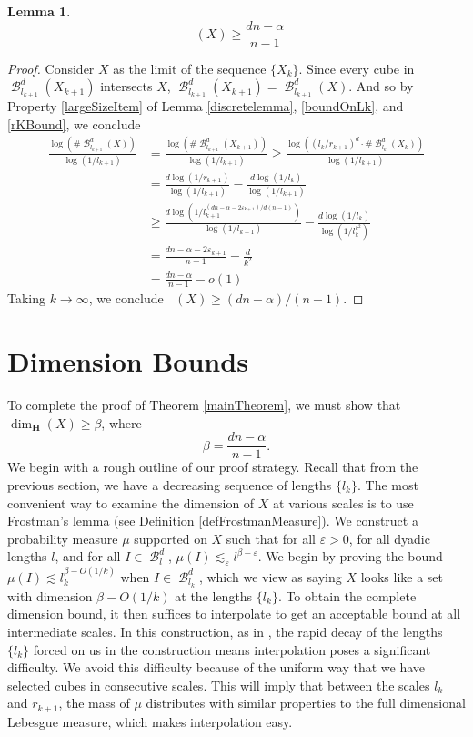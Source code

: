\documentclass[dvipsnames,letterpaper,12pt]{article}
\numberwithin{equation}{section}
\theoremstyle{plain}
\newtheorem{lemma}{Lemma}
\theoremstyle{remark}
\DeclareMathOperator{\upminkdim}{\overline{\dim}_{\mathbf{M}}}
\DeclareMathOperator{\B}{\mathcal{B}}
\begin{document}
\begin{lemma}
	\[ \upminkdim(X) \geq \frac{dn - \alpha}{n - 1} \]
\end{lemma}
\begin{proof}
	Consider $X$ as the limit of the sequence $\{ X_k \}$. Since every cube in $\B^d_{l_{k+1}}(X_{k+1})$ intersects $X$, $\B^d_{l_{k+1}}(X_{k+1}) = \B^d_{l_{k+1}}(X)$. And so by Property \ref{largeSizeItem} of Lemma \ref{discretelemma}, \eqref{boundOnLk}, and \eqref{rKBound}, we conclude
	\begin{align*}
		\frac{\log(\# \B^d_{l_{k+1}}(X))}{\log(1/l_{k+1})} &= \frac{\log(\# \B^d_{l_{k+1}}(X_{k+1}))}{\log(1/l_{k+1})} \geq \frac{\log((l_k/r_{k+1})^d \cdot \# \B^d_{l_k}(X_k))}{\log(1/l_{k+1})}\\
		&= \frac{d \log(1/r_{k+1})}{\log(1/l_{k+1})} - \frac{d \log(1/l_k)}{\log(1/l_{k+1})}\\
		&\geq \frac{d \log \left(1/l_{k+1}^{(dn - \alpha - 2\varepsilon_{k+1})/d(n-1)} \right)}{\log(1/l_{k+1})} - \frac{d \log(1/l_k)}{\log(1/l_k^{k^2})}\\
		&= \frac{dn - \alpha - 2\varepsilon_{k+1}}{n-1} - \frac{d}{k^2}\\
		&= \frac{dn - \alpha}{n-1} - o(1)
	\end{align*}
	Taking $k \to \infty$, we conclude $\upminkdim(X) \geq (dn - \alpha)/(n-1)$.
\end{proof}







\section{Dimension Bounds}\label{dimensionsection}

To complete the proof of Theorem \ref{mainTheorem}, we must show that $\dim_{\mathbf{H}}(X) \geq \beta$, where
%
\[ \beta = \frac{dn - \alpha}{n - 1}. \]
%
We begin with a rough outline of our proof strategy. Recall that from the previous section, we have a decreasing sequence of lengths $\{ l_k \}$. The most convenient way to examine the dimension of $X$ at various scales is to use Frostman's lemma (see Definition \ref{defFrostmanMeasure}). We construct a probability measure $\mu$ supported on $X$ such that for all $\varepsilon > 0$, for all dyadic lengths $l$, and for all $I \in \B^d_l$, $\mu(I) \lesssim_\varepsilon l^{\beta - \varepsilon}$. We begin by proving the bound $\mu(I) \lesssim l_k^{\beta - O(1/k)}$ when $I \in \B^d_{l_k}$, which we view as saying $X$ looks like a set with dimension $\beta - O(1/k)$ at the lengths $\{ l_k \}$. To obtain the complete dimension bound, it then suffices to interpolate to get an acceptable bound at all intermediate scales. In this construction, as in \cite{MalabikaRob}, the rapid decay of the lengths $\{ l_k \}$ forced on us in the construction means interpolation poses a significant difficulty. We avoid this difficulty because of the uniform way that we have selected cubes in consecutive scales. This will imply that between the scales $l_k$ and $r_{k+1}$, the mass of $\mu$ distributes with similar properties to the full dimensional Lebesgue measure, which makes interpolation easy.
\end{document}
